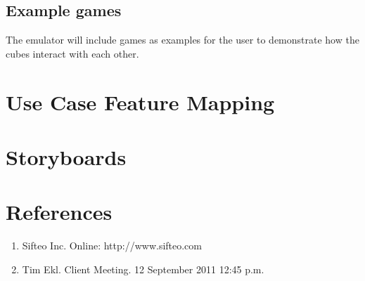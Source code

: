 \documentclass[12pt]{article}
\begin{document}
  \subsection{Example games}
    The emulator will include games as examples for the user to demonstrate how the cubes interact with each other.

\section{Use Case Feature Mapping}


\section{Storyboards}


\clearpage
{}
\printglossaries
\clearpage

\section*{References}

        \begin{enumerate}
                \item{Sifteo Inc. Online: http://www.sifteo.com}
                \item{Tim Ekl.  Client Meeting.  12 September 2011 12:45 p.m.}
        \end{enumerate}

\clearpage

\printindex
\end{document}

